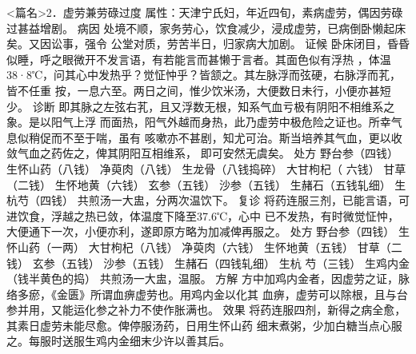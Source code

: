 \documentclass[a4paper,12pt,UTF8,twoside]{ctexbook}
\begin{document}
<篇名>2．虚劳兼劳碌过度
属性：天津宁氏妇，年近四旬，素病虚劳，偶因劳碌过甚益增剧。 
病因 处境不顺，家务劳心，饮食减少，浸成虚劳，已病倒卧懒起床矣。又因讼事，强令 
公堂对质，劳苦半日，归家病大加剧。 
证候 卧床闭目，昏昏似睡，呼之眼微开不发言语，有若能言而甚懒于言者。其面色似有浮热 
，体温38·8℃，问其心中发热乎？觉怔忡乎？皆颔之。其左脉浮而弦硬，右脉浮而芤，皆不任重 
按，一息六至。两日之间，惟少饮米汤，大便数日未行，小便亦甚短少。 
诊断 即其脉之左弦右芤，且又浮数无根，知系气血亏极有阴阳不相维系之象。是以阳气上浮 
而面热，阳气外越而身热，此乃虚劳中极危险之证也。所幸气息似稍促而不至于喘，虽有 
咳嗽亦不甚剧，知尤可治。斯当培养其气血，更以收敛气血之药佐之，俾其阴阳互相维系， 
即可安然无虞矣。 
处方 野台参（四钱） 生怀山药（八钱） 净萸肉（八钱） 生龙骨（八钱捣碎） 大甘枸杞（ 
六钱） 甘草（二钱） 生怀地黄（六钱） 玄参（五钱） 沙参（五钱） 生赭石（五钱轧细） 生杭芍（四钱） 
共煎汤一大盅，分两次温饮下。 
复诊 将药连服三剂，已能言语，可进饮食，浮越之热已敛，体温度下降至37.6℃，心中 
已不发热，有时微觉怔忡，大便通下一次，小便亦利，遂即原方略为加减俾再服之。 
处方 野台参（四钱） 生怀山药（一两） 大甘枸杞（八钱） 净萸肉（六钱） 
生怀地黄（五钱） 甘草（二钱） 玄参（五钱） 沙参（五钱） 生赭石（四钱轧细） 生杭 
芍（三钱） 生鸡内金（钱半黄色的捣） 
共煎汤一大盅，温服。 
方解 方中加鸡内金者，因虚劳之证，脉络多瘀，《金匮》所谓血痹虚劳也。用鸡内金以化其 
血痹，虚劳可以除根，且与台 
参并用，又能运化参之补力不使作胀满也。 
效果 将药连服四剂，新得之病全愈，其素日虚劳未能尽愈。俾停服汤药，日用生怀山药 
细末煮粥，少加白糖当点心服之。每服时送服生鸡内金细末少许以善其后。 
\end{document}
